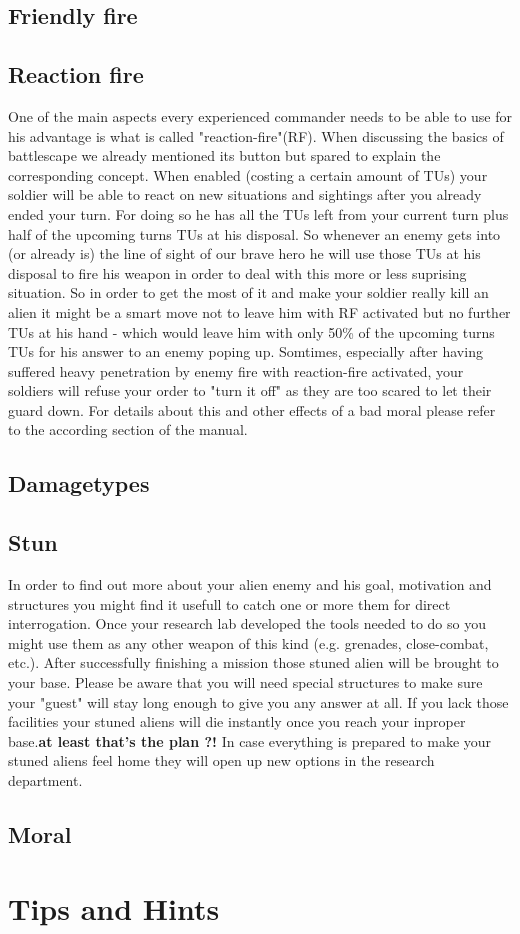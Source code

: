\subsection{Friendly fire}


\subsection{Reaction fire}
One of the main aspects every experienced commander needs to be able to use for his advantage is what is called "reaction-fire"(RF). When discussing the basics of battlescape we already mentioned its button but spared to explain the corresponding concept. When enabled (costing a certain amount of TUs) your soldier will be able to react on new situations and sightings after you already ended your turn. For doing so he has all the TUs left from your current turn plus half of the upcoming turns TUs at his disposal. So whenever an enemy gets into (or already is) the line of sight of our brave hero he will use those TUs at his disposal to fire his weapon in order to deal with this more or less suprising situation. So in order to get the most of it and make your soldier really kill an alien it might be a smart move not to leave him with RF activated but no further TUs at his hand - which would leave him with only 50\% of the upcoming turns TUs for his answer to an enemy poping up. Somtimes, especially after having suffered heavy penetration by enemy fire with reaction-fire activated, your soldiers will refuse your order to "turn it off" as they are too scared to let their guard down. For details about this and other effects of a bad moral please refer to the according section of the manual.

\subsection{Damagetypes}

\subsection{Stun}
In order to find out more about your alien enemy and his goal, motivation and structures you might find it usefull to catch one or more them for direct interrogation. Once your research lab developed the tools needed to do so you might use them as any other weapon of this kind (e.g. grenades, close-combat, etc.). After successfully finishing a mission those stuned alien will be brought to your base. Please be aware that you will need special structures to make sure your "guest" will stay long enough to give you any answer at all. If you lack those facilities your stuned aliens will die instantly once you reach your inproper base.\textbf{at least that's the plan ?!} In case everything is prepared to make your stuned aliens feel home they will open up new options in the research department.

\subsection{Moral}

\section{Tips and Hints}
